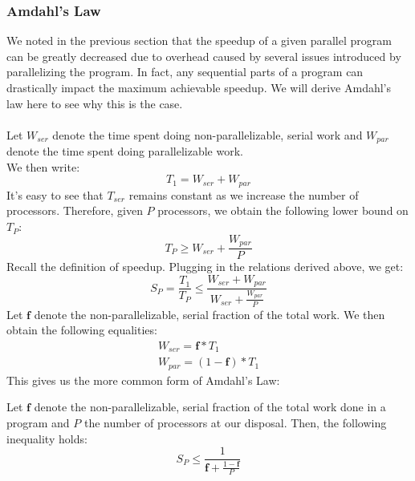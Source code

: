 \documentclass[main.tex]{subfiles}
\begin{document}

\subsubsection{Amdahl's Law}
We noted in the previous section that the speedup of a given parallel program can be greatly decreased due to overhead caused by several issues introduced by parallelizing the program. In fact, any sequential parts of a program can drastically impact the maximum achievable speedup. We will derive Amdahl's law here to see why this is the case.\\
\\
Let $W_{ser}$ denote the time spent doing non-parallelizable, serial work and $W_{par}$ denote the time spent doing parallelizable work.\\
We then write:
\begin{equation*}
    T_1 = W_{ser} + W_{par}
\end{equation*}
It's easy to see that $T_{ser}$ remains constant as we increase the number of processors. Therefore, given $P$ processors, we obtain the following lower bound on $T_P$:
\begin{equation*}
    T_P \geq W_{ser} + \frac{W_{par}}{P}
\end{equation*}
Recall the definition of speedup. Plugging in the relations derived above, we get:
\begin{equation*}
    S_P = \frac{T_1}{T_P} \leq \frac{W_{ser} + W_{par}}{W_{ser} + \frac{W_{par}}{P}}
\end{equation*}
Let $\mathbf{f}$ denote the non-parallelizable, serial fraction of the total work. We then obtain the following equalities:
\begin{gather*}
    W_{ser} = \mathbf{f}*T_1 \\
    W_{par} = (1-\mathbf{f})*T_1
\end{gather*}
This gives us the more common form of Amdahl's Law:
\begin{theorem} 
    Let $\mathbf{f}$ denote the non-parallelizable, serial fraction of the total work done in a program and $P$ the number of processors at our disposal. Then, the following inequality holds:
    \begin{equation*}
        S_P \leq \frac{1}{\mathbf{f} + \frac{1-\mathbf{f}}{P}}
    \end{equation*}
\end{theorem}
\end{document}
